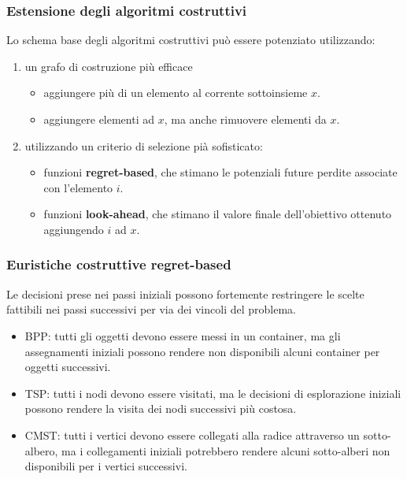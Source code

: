 \documentclass{article}
\begin{document}
\subsubsection{Estensione degli algoritmi costruttivi}
Lo schema base degli algoritmi costruttivi può essere potenziato utilizzando:
\begin{enumerate}
    \item un grafo di costruzione più efficace
          \begin{itemize}
              \item aggiungere più di un elemento al corrente sottoinsieme $x$.
              \item aggiungere elementi ad $x$, ma anche rimuovere elementi da $x$.
          \end{itemize}
    \item utilizzando un criterio di selezione pià sofisticato:
          \begin{itemize}
              \item funzioni \textbf{regret-based}, che stimano le potenziali future perdite associate con
                    l'elemento $i$.
              \item funzioni \textbf{look-ahead}, che stimano il valore finale dell'obiettivo ottenuto
                    aggiungendo $i$ ad $x$.
          \end{itemize}
\end{enumerate}

\subsubsection{Euristiche costruttive regret-based}
Le decisioni prese nei passi iniziali possono fortemente restringere le scelte fattibili nei passi
successivi per via dei vincoli del problema.
\begin{itemize}
    \item BPP: tutti gli oggetti devono essere messi in un container, ma gli assegnamenti
          iniziali possono rendere non disponibili alcuni container per oggetti successivi.
    \item TSP: tutti i nodi devono essere visitati, ma le decisioni di esplorazione
          iniziali possono rendere la visita dei nodi successivi più costosa.
    \item CMST: tutti i vertici devono essere collegati alla radice attraverso un sotto-albero,
          ma i collegamenti iniziali potrebbero rendere alcuni sotto-alberi non disponibili per i vertici
          successivi.
\end{itemize}
\end{document}
